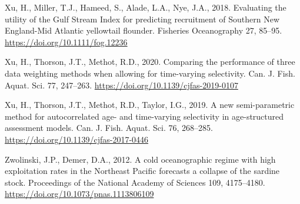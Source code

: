 \documentclass[]{article}
\begin{document}
\leavevmode\hypertarget{ref-xu2018Evaluating}{}%
Xu, H., Miller, T.J., Hameed, S., Alade, L.A., Nye, J.A., 2018.
Evaluating the utility of the Gulf Stream Index for predicting
recruitment of Southern New England-Mid Atlantic yellowtail flounder.
Fisheries Oceanography 27, 85--95.
\url{https://doi.org/10.1111/fog.12236}

\leavevmode\hypertarget{ref-xu2020Comparing}{}%
Xu, H., Thorson, J.T., Methot, R.D., 2020. Comparing the performance of
three data weighting methods when allowing for time-varying selectivity.
Can. J. Fish. Aquat. Sci. 77, 247--263.
\url{https://doi.org/10.1139/cjfas-2019-0107}

\leavevmode\hypertarget{ref-xu2019New}{}%
Xu, H., Thorson, J.T., Methot, R.D., Taylor, I.G., 2019. A new
semi-parametric method for autocorrelated age- and time-varying
selectivity in age-structured assessment models. Can. J. Fish. Aquat.
Sci. 76, 268--285. \url{https://doi.org/10.1139/cjfas-2017-0446}

\leavevmode\hypertarget{ref-zwolinski2012Cold}{}%
Zwolinski, J.P., Demer, D.A., 2012. A cold oceanographic regime with
high exploitation rates in the Northeast Pacific forecasts a collapse of
the sardine stock. Proceedings of the National Academy of Sciences 109,
4175--4180. \url{https://doi.org/10.1073/pnas.1113806109}

\pagebreak
\end{document}
